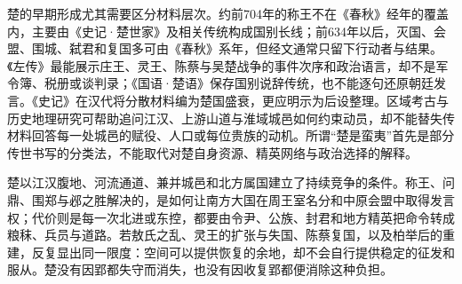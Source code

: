 \begin{sourcenote}[江汉国家怎样进入传世材料]
楚的早期形成尤其需要区分材料层次。约前704年的称王不在《春秋》经年的覆盖内，主要由《史记·楚世家》及相关传统构成国别长线；前634年以后，灭国、会盟、围城、弑君和复国多可由《春秋》系年，但经文通常只留下行动者与结果。《左传》最能展示庄王、灵王、陈蔡与吴楚战争的事件次序和政治语言，却不是军令簿、税册或谈判录；《国语·楚语》保存国别说辞传统，也不能逐句还原朝廷发言。《史记》在汉代将分散材料编为楚国盛衰，更应明示为后设整理。区域考古与历史地理研究可帮助追问江汉、上游山道与淮域城邑如何约束动员，却不能替失传材料回答每一处城邑的赋役、人口或每位贵族的动机。所谓“楚是蛮夷”首先是部分传世书写的分类法，不能取代对楚自身资源、精英网络与政治选择的解释。
\end{sourcenote}

\begin{turningpoint}
楚以江汉腹地、河流通道、兼并城邑和北方属国建立了持续竞争的条件。称王、问鼎、围郑与邲之胜解决的，是如何让南方大国在周王室名分和中原会盟中取得发言权；代价则是每一次北进或东控，都要由令尹、公族、封君和地方精英把命令转成粮秣、兵员与道路。若敖氏之乱、灵王的扩张与失国、陈蔡复国，以及柏举后的重建，反复显出同一限度：空间可以提供恢复的余地，却不会自行提供稳定的征发和服从。楚没有因郢都失守而消失，也没有因收复郢都便消除这种负担。
\end{turningpoint}
